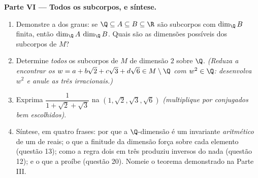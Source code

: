 \begin{problem}
\medskip
\noindent\textbf{Parte VI --- Todos os subcorpos, e síntese.}
\begin{enumerate}[resume]
  \item Demonstre a  dos graus: se $\Q \subseteq A
        \subseteq B \subseteq \R$ são
        subcorpos com $\dim_\Q B$ finita, então $\dim_\Q A$  $\dim_\Q B$. Quais
        são as dimensões possíveis dos subcorpos de $M$?
  \item Determine \emph{todos} os subcorpos de $M$ de dimensão $2$
        sobre $\Q$. \emph{(Reduza a encontrar os $w = a + b\sqrt2
        + c\sqrt3 + d\sqrt6 \in M \setminus \Q$ com $w^2 \in
        \Q$:
        desenvolva $w^2$ e anule as três  irracionais.)}
  \item Exprima $\dfrac1{1 + \sqrt2 + \sqrt3}$ na  $(1,
        \sqrt2, \sqrt3, \sqrt6)$ \emph{(multiplique por
        conjugados bem escolhidos)}.
  \item Síntese, em quatro frases: por que a $\Q$-dimensão é um
        invariante \emph{aritmético} de um  de reais; o que
        a finitude da dimensão força sobre cada elemento (questão
        13); como a regra dois em três produziu inversos do nada
        (questão 12); e o que a  proíbe (questão 20).
        Nomeie o teorema demonstrado na Parte III.
\end{enumerate}
\end{problem}
